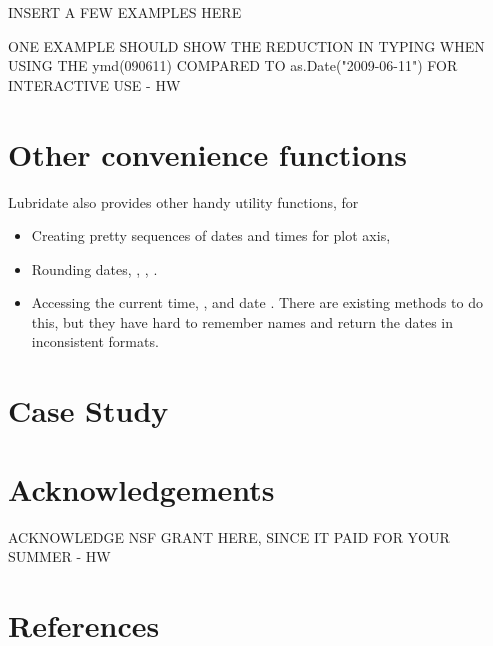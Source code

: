 \documentclass[article]{jss}
\begin{document}
INSERT A FEW EXAMPLES HERE

ONE EXAMPLE SHOULD SHOW THE REDUCTION IN TYPING WHEN USING THE ymd(090611) COMPARED TO as.Date("2009-06-11") FOR INTERACTIVE USE - HW


% 

\section{Other convenience functions}
\label{sec:utils}

Lubridate also provides other handy utility functions, for

\begin{itemize}
  \item Creating pretty sequences of dates and times for plot axis, 
  
  \item Rounding dates, , , .

  \item Accessing the current time, , and date .  There are existing methods to do this, but they have hard to remember names and return the dates in inconsistent formats.
  
\end{itemize}

\section{Case Study}

\section*{Acknowledgements}

ACKNOWLEDGE NSF GRANT HERE, SINCE IT PAID FOR YOUR SUMMER - HW

\section*{References}
\end{document}
